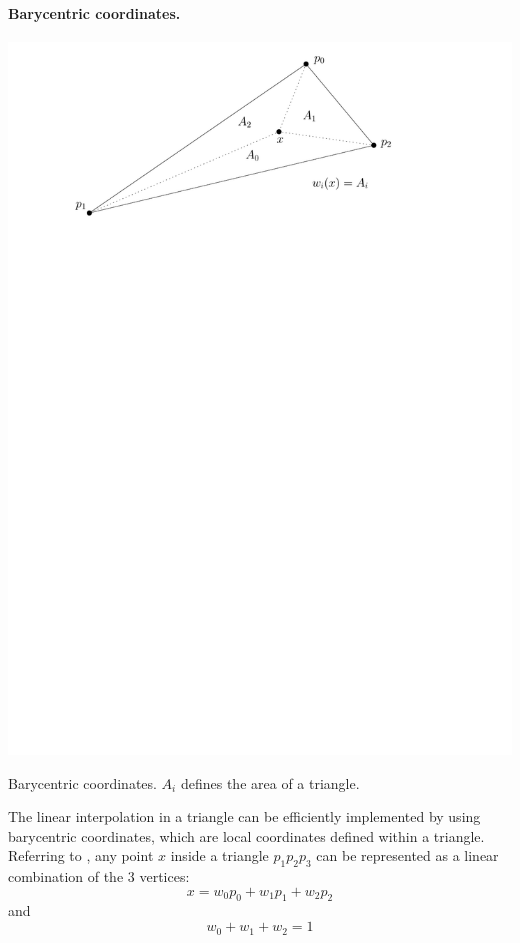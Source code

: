 \paragraph{Barycentric coordinates.}
\begin{marginfigure}
  \centering
  \includegraphics[width=\textwidth]{figs/li}
  \caption{Barycentric coordinates. $A_i$ defines the area of a triangle.} %
\end{marginfigure}
The linear interpolation in a triangle can be efficiently implemented by using barycentric coordinates, which are local coordinates defined within a triangle.
Referring to , any point $x$ inside a triangle $p_1p_2p_3$ can be represented as a linear combination of the 3 vertices:
\begin{equation}
  x = w_0p_0 + w_1p_1 + w_2p_2
\end{equation}
and 
\begin{equation}
  w_0 + w_1 + w_2 = 1   
\end{equation}
